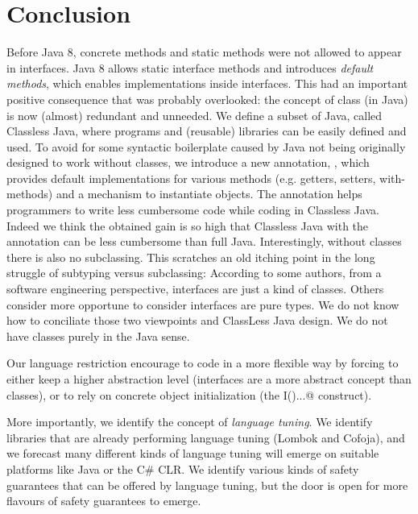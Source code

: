 \section{Conclusion}\label{sec:conclusion}

Before Java 8, concrete methods and static methods were not allowed
to appear in interfaces.  Java 8 allows static interface methods and
introduces \emph{default methods}, which enables implementations
inside interfaces. This had an important positive consequence that
was probably overlooked: the concept of class
(in Java) is now (almost) redundant and unneeded.  We define a subset of Java,
called Classless Java, where programs and (reusable) libraries can be
easily defined and used.  To avoid for some syntactic boilerplate
caused by Java not being originally designed to work without classes,
we introduce a new annotation, \mixin, which provides default implementations
for various methods (e.g. getters, setters, with-methods) and a
mechanism to instantiate objects. The \mixin annotation helps programmers
to write less cumbersome code while coding in Classless Java. Indeed
we think the obtained gain is so high that Classless Java with the \mixin
annotation can be less cumbersome than full Java.
Interestingly, without classes there is also no subclassing. This scratches an old
  itching point in the long struggle of subtyping versus subclassing:
  According to some authors, from a software engineering perspective,
  interfaces are just a kind of classes. Others consider more
  opportune to consider interfaces are pure types. We do not know how to conciliate
  those two viewpoints and ClassLess Java design.
  We do not have classes purely in the Java sense.
  
 Our language restriction encourage to code in a more flexible way by forcing to either keep a higher
 abstraction level (interfaces are a more abstract concept than classes), or to rely on
 concrete object initialization (the \Q@new I(){...}@ construct).
 
 More importantly, we identify the concept of \emph{language tuning}.
 We identify libraries that are already performing language tuning (Lombok and Cofoja), and 
 we forecast many different kinds of language tuning will emerge on suitable platforms like Java or the C\# CLR.
 We identify various kinds of safety guarantees that can be offered by language tuning, but the door is open for more flavours of safety guarantees to emerge.
